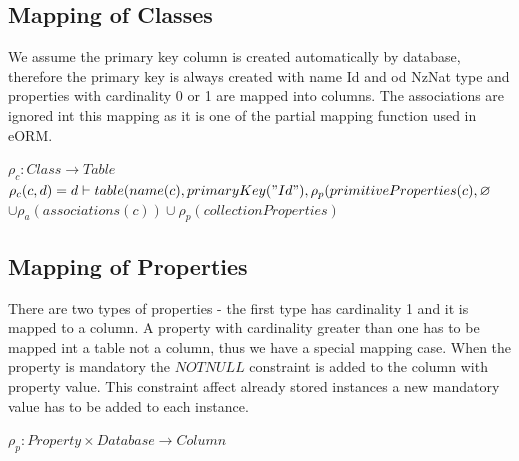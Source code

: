 \documentclass[11pt]{article}
\begin{document}
\subsection{Mapping of Classes}
We assume the primary key column is created automatically by database, therefore the primary key is always created with name Id and od NzNat type and properties with cardinality 0 or 1 are mapped into columns. The associations are ignored int this mapping as it is one of the partial mapping function used in eORM.

\begin{center}
$\rho_{c}: Class \rightarrow Table $ \\ 
$\rho_{c}(c,d) = d \vdash table(name(c), primaryKey("Id"), \rho_{p}(primitiveProperties(c), \varnothing $\\$ \cup \rho_{a}(associations(c)) \cup \rho_{p}(collectionProperties)$
\end{center}



\subsection{Mapping of Properties}
There are two types of properties - the first type has cardinality 1  and it is mapped to a column. A property with cardinality greater than one has to be mapped int a table not a column, thus we have a special mapping case. When the property is mandatory the $NOTNULL$ constraint is added to the column with property value. This constraint affect already stored instances a new mandatory value has to be added to each instance.

$
\rho_p : Property \times Database \rightarrow Column 
$
\end{document}
